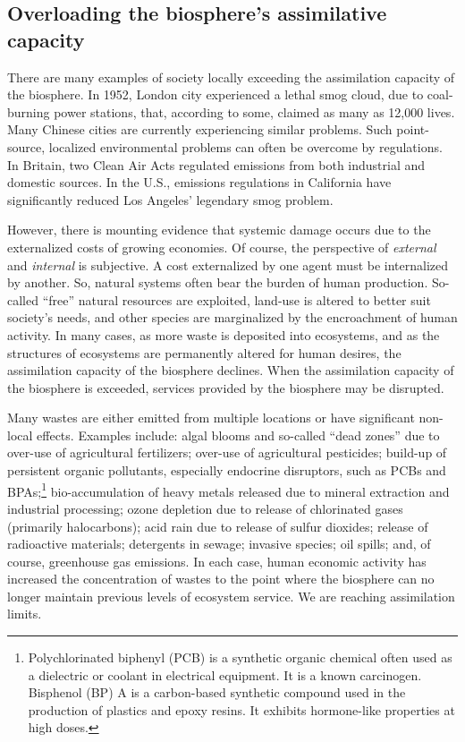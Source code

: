 \subsection{Overloading the biosphere's assimilative capacity}


There are many examples of society locally exceeding 
the assimilation capacity of the biosphere.
In 1952, London city experienced a lethal smog cloud,
due to coal-burning power stations,
that, according to some, 
claimed as many as 12,000 lives.\cite{Davis2002,Bell2004}
Many Chinese cities are currently experiencing similar problems.
Such point-source, localized environmental problems can often be overcome
by regulations.
In Britain, two Clean Air Acts regulated emissions from both
industrial and domestic sources.\cite{Brimblecombe2006}	
In the U.S., emissions regulations in California have 
significantly reduced Los Angeles' legendary smog problem.

However, there is mounting evidence that systemic
damage occurs due to the externalized costs
of growing economies.
Of course, the perspective of \emph{external} and \emph{internal} is subjective.
A cost externalized by one agent
must be internalized by another.\cite{MEA2005,Ewing2008}
So, natural systems often bear the burden of human production.
So-called ``free'' natural resources are exploited,
land-use is altered to better suit society's needs,
and other species are marginalized by the encroachment of human activity.\cite{schnaiberg1980}
In many cases, as more waste is deposited into ecosystems,
and as the structures of ecosystems are permanently altered for human desires,
the assimilation capacity of the biosphere declines.
When the assimilation capacity of the biosphere is exceeded, 
services provided by the biosphere may be disrupted.\cite{UNMEA2005}

Many wastes are either emitted from multiple locations or have 
significant non-local effects. 
Examples include:
algal blooms and so-called ``dead zones'' due to over-use of agricultural fertilizers;
over-use of agricultural pesticides;
build-up of persistent organic pollutants, especially endocrine disruptors, such as PCBs 
	and BPAs;\footnote{Polychlorinated biphenyl (PCB) 
		is a synthetic organic chemical often used as 
		a dielectric or coolant in electrical equipment.
		It is a known carcinogen.
		Bisphenol (BP) A is a carbon-based synthetic compound used in the production
		of plastics and epoxy resins. It exhibits hormone-like properties at high doses.
		}
bio-accumulation of heavy metals released due to mineral extraction and industrial processing;
ozone depletion due to release of chlorinated gases (primarily halocarbons);
acid rain due to release of sulfur dioxides;
release of radioactive materials;
detergents in sewage;
invasive species;
oil spills;
and, of course, greenhouse gas emissions.\cite{UNMEA2005, Butler1978, Walker2012}
In each case, human economic activity has increased the concentration
of wastes to the point where the biosphere can no longer maintain 
previous levels of ecosystem service.
We are reaching assimilation limits.


